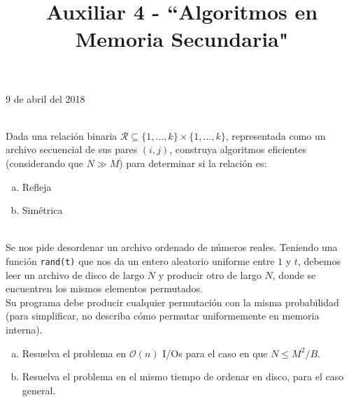 \documentclass[dcc,uchile]{fcfmcourse}
\title{Auxiliar 4 - ``Algoritmos en Memoria Secundaria"}
\theoremstyle{plain}
\theoremstyle{definition}
\begin{document}
\maketitle
\begin{center}
9 de abril del 2018
\end{center}


\vspace{-1ex}


\begin{problems}

\\
Dada una relación binaria $\mathcal{R} \subseteq \{1, \ldots, k \} \times \{1, \ldots, k \}$, representada como un archivo secuencial de sus pares $(i, j)$, construya algoritmos eficientes (considerando
que $N \gg M$) para determinar si la relación es:
\begin{enumerate}[a)]
    \item Refleja
    \item Simétrica
\end{enumerate}

\\
Se nos pide desordenar un archivo ordenado de números reales. Teniendo una función \texttt{rand(t)}
que nos da un entero aleatorio uniforme entre $1$ y $t$, debemos leer un archivo de disco de largo $N$ y producir otro de largo $N$, donde se encuentren los mismos elementos permutados.\\
Su programa debe producir cualquier permutación con la misma probabilidad (para simplificar, no describa cómo permutar uniformemente en memoria interna).
\begin{enumerate}[a)]
    \item Resuelva el problema en $\mathcal{O}(n)$ I/Os para el caso en que $N \le M^2/B$.
    \item Resuelva el problema en el mismo tiempo de ordenar en disco, para el caso general.
\end{enumerate}


\end{problems}
\end{document}
